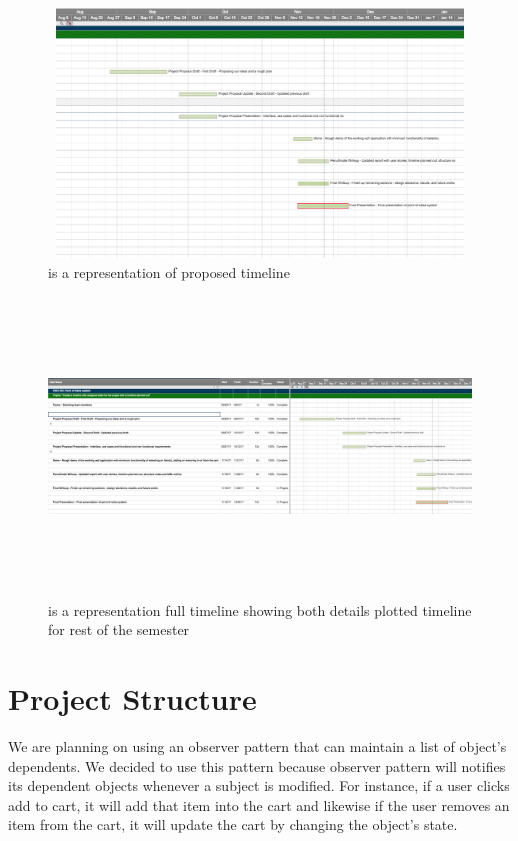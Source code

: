 \documentclass[10pt,conference,onecolumn,compsoc]{IEEEtran}
\begin{document}
\begin{figure}[H]
\includegraphics[height=250px, width=500px]{timeline}
\caption{is a  representation of proposed timeline}
\label{timeline}
\end{figure}

\begin{figure}[H]
\includegraphics[height=300px, width=500px]{fullPT}
\caption{is a  representation full timeline showing both details plotted timeline for rest of the semester}
\label{fullPT}
\end{figure}


\section{Project Structure}
We are planning on using an observer pattern that can maintain a list of object's dependents. We decided to use this pattern because observer pattern will notifies its dependent objects whenever a subject is modified. For instance, if a user clicks add to cart, it will add that item into the cart and likewise if the user removes an item from the cart, it will update the cart by changing the object's state. 
\end{document}
